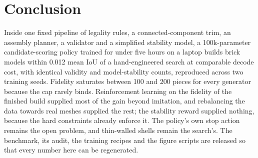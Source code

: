 \section{Conclusion}

Inside one fixed pipeline of legality rules, a connected-component trim, an assembly planner, a validator and a
simplified stability model, a 100k-parameter candidate-scoring policy trained for under five hours on a laptop builds
brick models within 0.012 mean IoU of a hand-engineered search at comparable decode cost, with identical validity and
model-stability counts, reproduced across two training seeds. Fidelity saturates between 100 and 200 pieces for
every generator because the cap rarely binds. Reinforcement learning on the fidelity of the finished build supplied
most of the gain beyond imitation, and rebalancing the data towards real meshes supplied the rest; the stability
reward supplied nothing, because the hard constraints already enforce it. The policy's own stop action remains the
open problem, and thin-walled shells remain the search's. The benchmark, its audit, the training recipes and the
figure scripts are released so that every number here can be regenerated.
